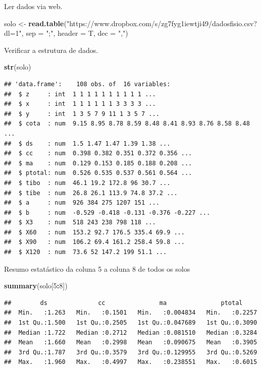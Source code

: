 \documentclass[
]{book}
\newenvironment{Shaded}{\begin{snugshade}}{\end{snugshade}}
\newcommand{\DataTypeTok}[1]{\textcolor[rgb]{0.13,0.29,0.53}{#1}}
\newcommand{\DecValTok}[1]{\textcolor[rgb]{0.00,0.00,0.81}{#1}}
\newcommand{\KeywordTok}[1]{\textcolor[rgb]{0.13,0.29,0.53}{\textbf{#1}}}
\newcommand{\NormalTok}[1]{#1}
\newcommand{\OperatorTok}[1]{\textcolor[rgb]{0.81,0.36,0.00}{\textbf{#1}}}
\newcommand{\StringTok}[1]{\textcolor[rgb]{0.31,0.60,0.02}{#1}}
\begin{document}
Ler dados via web.

\begin{Shaded}
\begin{Highlighting}[]
\NormalTok{solo <-}\StringTok{ }\KeywordTok{read.table}\NormalTok{(}\StringTok{"https://www.dropbox.com/s/zg7fyg1iewtji49/dadosfisio.csv?dl=1"}\NormalTok{, }\DataTypeTok{sep =} \StringTok{";"}\NormalTok{, }\DataTypeTok{header =}\NormalTok{ T, }\DataTypeTok{dec =} \StringTok{","}\NormalTok{)}
\end{Highlighting}
\end{Shaded}

Verificar a estrutura de dados.

\begin{Shaded}
\begin{Highlighting}[]
\KeywordTok{str}\NormalTok{(solo)}
\end{Highlighting}
\end{Shaded}

\begin{verbatim}
## 'data.frame':    108 obs. of  16 variables:
##  $ z     : int  1 1 1 1 1 1 1 1 1 1 ...
##  $ x     : int  1 1 1 1 1 1 3 3 3 3 ...
##  $ y     : int  1 3 5 7 9 11 1 3 5 7 ...
##  $ cota  : num  9.15 8.95 8.78 8.59 8.48 8.41 8.93 8.76 8.58 8.48 ...
##  $ ds    : num  1.5 1.47 1.47 1.39 1.38 ...
##  $ cc    : num  0.398 0.382 0.351 0.372 0.356 ...
##  $ ma    : num  0.129 0.153 0.185 0.188 0.208 ...
##  $ ptotal: num  0.526 0.535 0.537 0.561 0.564 ...
##  $ tibo  : num  46.1 19.2 172.8 96 30.7 ...
##  $ tibe  : num  26.8 26.1 113.9 74.8 37.2 ...
##  $ a     : num  926 384 275 1207 151 ...
##  $ b     : num  -0.529 -0.418 -0.131 -0.376 -0.227 ...
##  $ X3    : num  518 243 238 798 118 ...
##  $ X60   : num  153.2 92.7 176.5 335.4 69.9 ...
##  $ X90   : num  106.2 69.4 161.2 258.4 59.8 ...
##  $ X120  : num  73.6 52 147.2 199 51.1 ...
\end{verbatim}

Resumo estatástico da coluna 5 a coluna 8 de todos os solos

\begin{Shaded}
\begin{Highlighting}[]
\KeywordTok{summary}\NormalTok{(solo[}\DecValTok{5}\OperatorTok{:}\DecValTok{8}\NormalTok{])}
\end{Highlighting}
\end{Shaded}

\begin{verbatim}
##        ds              cc               ma               ptotal      
##  Min.   :1.263   Min.   :0.1501   Min.   :0.004834   Min.   :0.2257  
##  1st Qu.:1.500   1st Qu.:0.2505   1st Qu.:0.047689   1st Qu.:0.3090  
##  Median :1.722   Median :0.2712   Median :0.081510   Median :0.3284  
##  Mean   :1.660   Mean   :0.2998   Mean   :0.090675   Mean   :0.3905  
##  3rd Qu.:1.787   3rd Qu.:0.3579   3rd Qu.:0.129955   3rd Qu.:0.5269  
##  Max.   :1.960   Max.   :0.4997   Max.   :0.238551   Max.   :0.6015
\end{verbatim}
\end{document}

